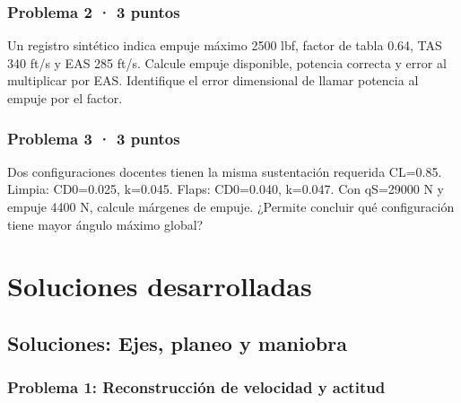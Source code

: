 
\section{Problema 2 · 3 puntos}

Un registro sintético indica empuje máximo 2500 lbf, factor de tabla 0.64, TAS 340 ft/s y EAS 285 ft/s. Calcule empuje disponible, potencia correcta y error al multiplicar por EAS. Identifique el error dimensional de llamar potencia al empuje por el factor.


\section{Problema 3 · 3 puntos}

Dos configuraciones docentes tienen la misma sustentación requerida CL=0.85. Limpia: CD0=0.025, k=0.045. Flaps: CD0=0.040, k=0.047. Con qS=29000 N y empuje 4400 N, calcule márgenes de empuje. ¿Permite concluir qué configuración tiene mayor ángulo máximo global?


\part{Soluciones desarrolladas}

\chapter{Soluciones: Ejes, planeo y maniobra}



\section{Problema 1: Reconstrucción de velocidad y actitud}



